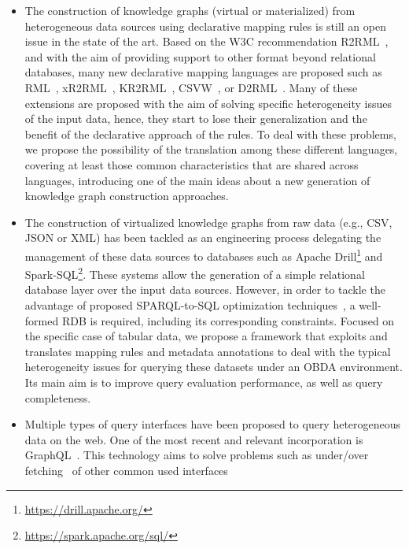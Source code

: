 \begin{itemize}
    \item The construction of knowledge graphs (virtual or materialized) from heterogeneous data sources using declarative mapping rules is still an open issue in the state of the art. Based on the W3C recommendation R2RML~\citep{R2RML}, and with the aim of providing support to other format beyond relational databases, many new declarative mapping languages are proposed such as RML~\citep{dimou2014rml}, xR2RML~\citep{michel2015translation}, KR2RML~\citep{slepicka2015kr2rml}, CSVW~\citep{tennison2015model}, or D2RML~\citep{chortaras2018mapping}. 
    Many of these extensions are proposed with the aim of solving specific heterogeneity issues of the input data, hence, they start to lose their generalization and the benefit of the declarative approach of the rules. To deal with these problems, we propose the possibility of the translation among these different languages, covering at least those common characteristics that are shared across languages, introducing one of the main ideas about a new generation of knowledge graph construction approaches.
    \item The construction of virtualized knowledge graphs from raw data (e.g., CSV, JSON or XML) has been tackled as an engineering process delegating the management of these data sources to databases such as Apache Drill\footnote{\url{https://drill.apache.org/}} and Spark-SQL\footnote{\url{https://spark.apache.org/sql/}}. These systems allow the generation of a simple relational database layer over the input data sources. However, in order to tackle the advantage of proposed SPARQL-to-SQL optimization techniques~\citep{priyatna2014formalisation,calvanese2017ontop}, a well-formed RDB is required, including its corresponding constraints. Focused on the specific case of tabular data, we propose a framework that exploits and translates mapping rules and metadata annotations to deal with the typical heterogeneity issues for querying these datasets under an OBDA environment. Its main aim is to improve query evaluation performance, as well as query completeness.
    \item Multiple types of query interfaces have been proposed to query heterogeneous data on the web. One of the most recent and relevant incorporation is GraphQL~\citep{graphql}. This technology aims to solve problems such as under/over fetching~\citep{bryant2017graphql,vogel2017experiences,mukhiya2019graphql} of other common used interfaces 

\end{itemize}
